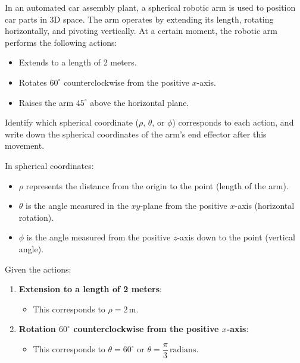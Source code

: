 \begin{example}
In an automated car assembly plant, a spherical robotic arm is used to position car parts in 3D space. The arm operates by extending its length, rotating horizontally, and pivoting vertically. At a certain moment, the robotic arm performs the following actions:

\begin{itemize}
    \item Extends to a length of 2 meters.
    \item Rotates \( 60^\circ \) counterclockwise from the positive \( x \)-axis.
    \item Raises the arm \( 45^\circ \) above the horizontal plane.
\end{itemize}

\noindent Identify which spherical coordinate (\( \rho \), \( \theta \), or \( \phi \)) corresponds to each action, and write down the spherical coordinates of the arm's end effector after this movement.

\begin{solution}
In spherical coordinates:
\begin{itemize}
    \item \( \rho \) represents the distance from the origin to the point (length of the arm).
    \item \( \theta \) is the angle measured in the \( xy \)-plane from the positive \( x \)-axis (horizontal rotation).
    \item \( \phi \) is the angle measured from the positive \( z \)-axis down to the point (vertical angle).
\end{itemize}

Given the actions:

\begin{enumerate}
    \item \textbf{Extension to a length of 2 meters}:
        \begin{itemize}
            \item This corresponds to \( \rho = 2 \, \text{m} \).
        \end{itemize}

    \item \textbf{Rotation \( 60^\circ \) counterclockwise from the positive \( x \)-axis}:
        \begin{itemize}
            \item This corresponds to \( \theta = 60^\circ \) or \( \theta = \dfrac{\pi}{3} \, \text{radians} \).
        \end{itemize}


\end{enumerate}
\end{solution}
\end{example}
